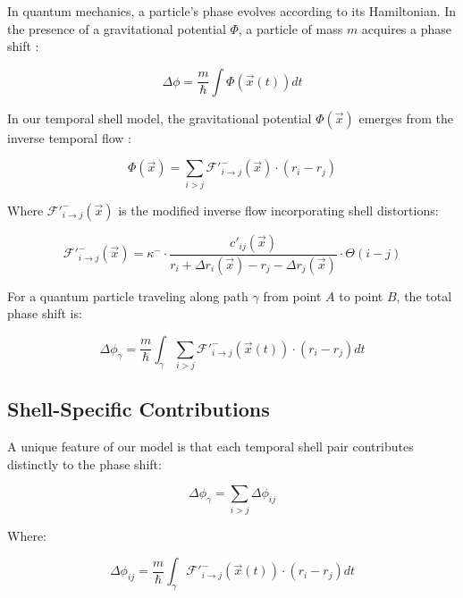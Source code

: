 \documentclass[12pt,a4paper]{article}
\begin{document}
In quantum mechanics, a particle's phase evolves according to its Hamiltonian. In the presence of a gravitational potential $\Phi$, a particle of mass $m$ acquires a phase shift \citep{cow}:

\begin{equation}
\Delta \phi = \frac{m}{\hbar} \int \Phi(\vec{x}(t)) dt
\end{equation}

In our temporal shell model, the gravitational potential $\Phi(\vec{x})$ emerges from the inverse temporal flow \citep{verlinde}:

\begin{equation}
\Phi(\vec{x}) = \sum_{i>j} \mathcal{F}'^{-}_{i \to j}(\vec{x}) \cdot (r_i - r_j)
\end{equation}

Where $\mathcal{F}'^{-}_{i \to j}(\vec{x})$ is the modified inverse flow incorporating shell distortions:

\begin{equation}
\mathcal{F}'^{-}_{i \to j}(\vec{x}) = \kappa^- \cdot \frac{c'_{ij}(\vec{x})}{r_i + \Delta r_i(\vec{x}) - r_j - \Delta r_j(\vec{x})} \cdot \Theta(i - j)
\end{equation}

For a quantum particle traveling along path $\gamma$ from point $A$ to point $B$, the total phase shift is:

\begin{equation}
\Delta \phi_{\gamma} = \frac{m}{\hbar} \int_{\gamma} \sum_{i>j} \mathcal{F}'^{-}_{i \to j}(\vec{x}(t)) \cdot (r_i - r_j) dt
\end{equation}

\subsection{Shell-Specific Contributions}

A unique feature of our model is that each temporal shell pair contributes distinctly to the phase shift:

\begin{equation}
\Delta \phi_{\gamma} = \sum_{i>j} \Delta \phi_{ij}
\end{equation}

Where:

\begin{equation}
\Delta \phi_{ij} = \frac{m}{\hbar} \int_{\gamma} \mathcal{F}'^{-}_{i \to j}(\vec{x}(t)) \cdot (r_i - r_j) dt
\end{equation}
\end{document}
